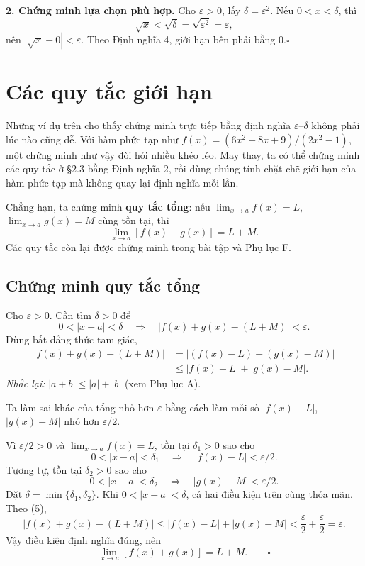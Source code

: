 \documentclass[12pt,a4paper]{article}
\begin{document}
\noindent\textbf{2. Chứng minh lựa chọn phù hợp.} Cho $\varepsilon>0$, lấy $\delta=\varepsilon^2$. Nếu $0<x<\delta$, thì
\[\sqrt{x}<\sqrt{\delta}=\sqrt{\varepsilon^2}=\varepsilon,\]
nên $|\sqrt{x}-0|<\varepsilon$. Theo Định nghĩa 4, giới hạn bên phải bằng 0.\hfill$\square$
\section*{Các quy tắc giới hạn}
Những ví dụ trên cho thấy chứng minh trực tiếp bằng định nghĩa $\varepsilon$–$\delta$ không phải lúc nào cũng dễ. Với hàm phức tạp như $f(x)=(6x^2-8x+9)/(2x^2-1)$, một chứng minh như vậy đòi hỏi nhiều khéo léo. May thay, ta có thể chứng minh các quy tắc ở §2.3 bằng Định nghĩa 2, rồi dùng chúng tính chặt chẽ giới hạn của hàm phức tạp mà không quay lại định nghĩa mỗi lần.

Chẳng hạn, ta chứng minh \textbf{quy tắc tổng}: nếu $\lim_{x\to a}f(x)=L$, $\lim_{x\to a}g(x)=M$ cùng tồn tại, thì
\[\lim_{x\to a}[f(x)+g(x)]=L+M.\]
Các quy tắc còn lại được chứng minh trong bài tập và Phụ lục F.
\subsection*{Chứng minh quy tắc tổng}
Cho $\varepsilon>0$. Cần tìm $\delta>0$ để
\[0<|x-a|<\delta\quad\Longrightarrow\quad |f(x)+g(x)-(L+M)|<\varepsilon.\]
Dùng bất đẳng thức tam giác,
\begin{equation}
\begin{split}
|f(x)+g(x)-(L+M)|&=|(f(x)-L)+(g(x)-M)|\\
&\le|f(x)-L|+|g(x)-M|.
\end{split}\tag{5}
\end{equation}
\noindent\textit{Nhắc lại:} $|a+b|\le|a|+|b|$ (xem Phụ lục A).

Ta làm sai khác của tổng nhỏ hơn $\varepsilon$ bằng cách làm mỗi số $|f(x)-L|$, $|g(x)-M|$ nhỏ hơn $\varepsilon/2$.

Vì $\varepsilon/2>0$ và $\lim_{x\to a}f(x)=L$, tồn tại $\delta_1>0$ sao cho
\[0<|x-a|<\delta_1\quad\Longrightarrow\quad |f(x)-L|<\varepsilon/2.\]
Tương tự, tồn tại $\delta_2>0$ sao cho
\[0<|x-a|<\delta_2\quad\Longrightarrow\quad |g(x)-M|<\varepsilon/2.\]
Đặt $\delta=\min\{\delta_1,\delta_2\}$. Khi $0<|x-a|<\delta$, cả hai điều kiện trên cùng thỏa mãn. Theo (5),
\[|f(x)+g(x)-(L+M)|\le|f(x)-L|+|g(x)-M|<\frac\varepsilon2+\frac\varepsilon2=\varepsilon.\]
Vậy điều kiện định nghĩa đúng, nên
\[\lim_{x\to a}[f(x)+g(x)]=L+M.\qquad\square\]
\end{document}

